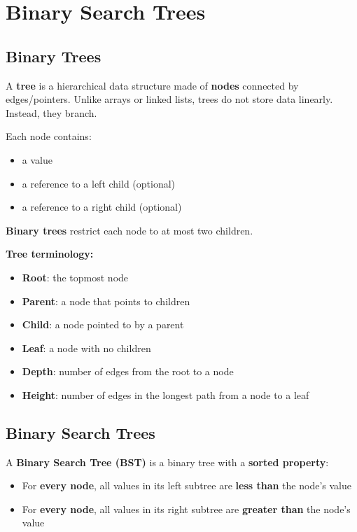 \section{Binary Search Trees}

\subsection{Binary Trees}

A \textbf{tree} is a hierarchical data structure made of \textbf{nodes} connected by edges/pointers.  
Unlike arrays or linked lists, trees do not store data linearly. Instead, they branch.

Each node contains:
\begin{itemize}
  \item a value
  \item a reference to a left child (optional)
  \item a reference to a right child (optional)
\end{itemize}

\textbf{Binary trees} restrict each node to at most two children.

\textbf{Tree terminology:}
\begin{itemize}
  \item \textbf{Root}: the topmost node
  \item \textbf{Parent}: a node that points to children
  \item \textbf{Child}: a node pointed to by a parent
  \item \textbf{Leaf}: a node with no children
  \item \textbf{Depth}: number of edges from the root to a node
  \item \textbf{Height}: number of edges in the longest path from a node to a leaf
\end{itemize}

\subsection{Binary Search Trees}

A \textbf{Binary Search Tree (BST)} is a binary tree with a \textbf{sorted property}:

\begin{itemize}
  \item For \textbf{every node}, all values in its left subtree are \textbf{less than} the node's value
  \item For \textbf{every node}, all values in its right subtree are \textbf{greater than} the node's value
\end{itemize}

